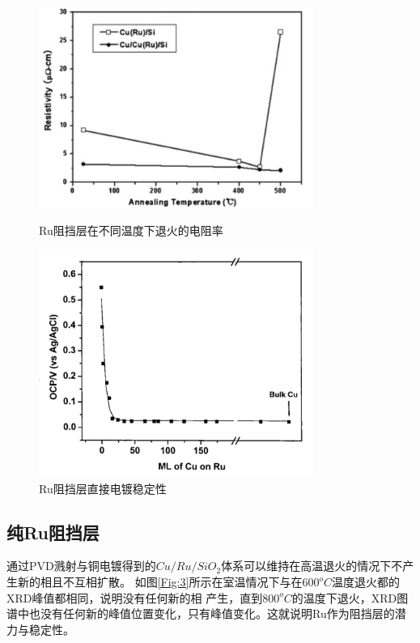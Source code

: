 \documentclass[UTF8,a4paper,12pt]{ctexart}%
\begin{document}
\begin{figure}[htb]
	\centering
	\begin{minipage}[t]{0.5\textwidth}
	\centering
	\includegraphics[width=0.8\textwidth]{1.jpg}
	\caption{Ru阻挡层在不同温度下退火的电阻率}
	\label{Fig:1}
	\end{minipage}
	\begin{minipage}[t]{0.45\textwidth}
	\centering
	\includegraphics[width=0.8\textwidth]{2.jpg}
	\caption{Ru阻挡层直接电镀稳定性}
	\label{Fig:2}
	\end{minipage}
\end{figure}


\subsection{纯Ru阻挡层}

通过PVD溅射与铜电镀得到的$Cu/Ru/SiO_2$体系可以维持在高温退火的情况下不产生新的相且不互相扩散。
如图\ref{Fig:3}所示在室温情况下与在$600^oC$温度退火都的XRD峰值都相同，说明没有任何新的相
产生，直到$800^oC$的温度下退火，XRD图谱中也没有任何新的峰值位置变化，只有峰值变化。这就说明Ru作为阻挡层的潜力与稳定性。
\end{document}
